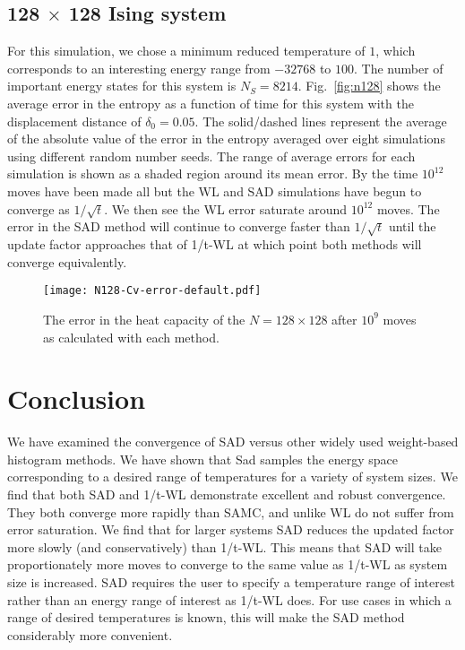\documentclass[letterpaper,twocolumn,amsmath,amssymb,pre,aps,10pt]{revtex4-1}
\begin{document}
\subsection{128 $\times$ 128 Ising system}
For this simulation, we chose a minimum reduced temperature of $1$, which
corresponds to an interesting energy range from $-32768$ to $100$.  The number of
important energy states for this system is $N_S = 8214$.
Fig.~\ref{fig:n128} shows the average error in the entropy as a function of time
for this system with the displacement distance of $\delta_0 = 0.05$. The solid/dashed
lines represent the average of the absolute value of the error in the entropy
averaged over eight simulations using different random number seeds. The range
of average errors for each simulation is shown as a shaded region around its
mean error. By the time $10^{12}$ moves have been made all but the WL and SAD
simulations have begun to converge as $1/\sqrt{t}$. We then see the WL error
saturate around $10^{12}$ moves. The error in the SAD method will continue to
converge faster than $1/\sqrt{t}$ until the update factor approaches that of
1/t-WL at which point both methods will converge equivalently.

\begin{figure}
  \texttt{[image: N128-Cv-error-default.pdf]}
  \caption{The error in the heat capacity of the $N=128 \times 128$ after $10^{9}$ moves as calculated with each method.}
  \label{fig:N128-cv-error}
\end{figure}

\section{Conclusion}
We have examined the convergence of SAD versus other widely used weight-based
histogram methods.  We have shown that Sad samples the energy space
corresponding to a desired range of temperatures for a variety of system sizes.
We find that both SAD and 1/t-WL demonstrate excellent and robust convergence.
They both converge more rapidly than SAMC, and unlike WL do not suffer from
error saturation. We find that for larger systems SAD reduces the updated factor
more slowly (and conservatively) than 1/t-WL. This means that SAD will take
proportionately more moves to converge to the same value as 1/t-WL as system
size is increased. SAD requires the user to specify a temperature range of
interest rather than an energy range of interest as 1/t-WL does. For use cases
in which a range of desired temperatures is known, this will make the SAD method
considerably more convenient.

\end{document}
